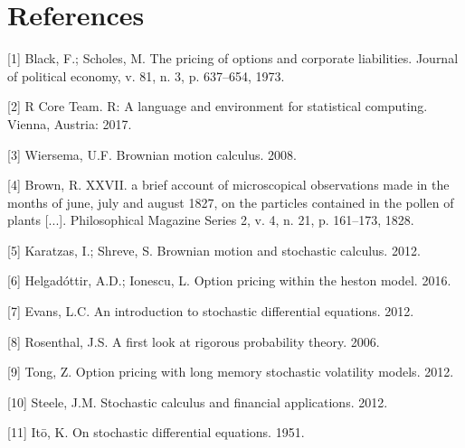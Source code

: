 \documentclass[12pt,oneside]{reedthesis}
\theoremstyle{definition}
\theoremstyle{definition}
\theoremstyle{remark}
\begin{document}
  \clearpage
  
  \backmatter
  
  \chapter{References}\label{references}
  
   
  
  \setlength{\parindent}{-0.0in} \setlength{\leftskip}{0.00in}
  \setlength{\parskip}{3pt}
  
  \hypertarget{refs}{}
  \hypertarget{ref-black1973pricing}{}
  {[}1{]} Black, F.; Scholes, M. The pricing of options and corporate
  liabilities. Journal of political economy, v. 81, n. 3, p. 637--654,
  1973.
  
  \hypertarget{ref-rlang}{}
  {[}2{]} R Core Team. R: A language and environment for statistical
  computing. Vienna, Austria: 2017.
  
  \hypertarget{ref-ubbo}{}
  {[}3{]} Wiersema, U.F. Brownian motion calculus. 2008.
  
  \hypertarget{ref-brown1828}{}
  {[}4{]} Brown, R. XXVII. a brief account of microscopical observations
  made in the months of june, july and august 1827, on the particles
  contained in the pollen of plants {[}...{]}. Philosophical Magazine
  Series 2, v. 4, n. 21, p. 161--173, 1828.
  
  \hypertarget{ref-karatzas2012brownian}{}
  {[}5{]} Karatzas, I.; Shreve, S. Brownian motion and stochastic
  calculus. 2012.
  
  \hypertarget{ref-helgadottir2016option}{}
  {[}6{]} Helgadóttir, A.D.; Ionescu, L. Option pricing within the heston
  model. 2016.
  
  \hypertarget{ref-evans}{}
  {[}7{]} Evans, L.C. An introduction to stochastic differential
  equations. 2012.
  
  \hypertarget{ref-rosenthal}{}
  {[}8{]} Rosenthal, J.S. A first look at rigorous probability theory.
  2006.
  
  \hypertarget{ref-tong2012option}{}
  {[}9{]} Tong, Z. Option pricing with long memory stochastic volatility
  models. 2012.
  
  \hypertarget{ref-steele2012stochastic}{}
  {[}10{]} Steele, J.M. Stochastic calculus and financial applications.
  2012.
  
  \hypertarget{ref-ito1951}{}
  {[}11{]} Itō, K. On stochastic differential equations. 1951.
  
\end{document}
